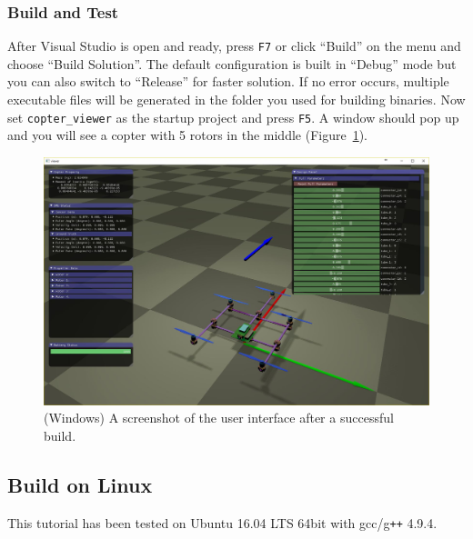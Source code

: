 \subsubsection{Build and Test}
After Visual Studio is open and ready, press \texttt{F7} or click ``Build'' on the menu and choose ``Build Solution''. The default configuration is built in ``Debug'' mode but you can also switch to ``Release'' for faster solution. If no error occurs, multiple executable files will be generated in the folder you used for building binaries. Now set \texttt{copter\_viewer} as the startup project and press \texttt{F5}. A window should pop up and you will see a copter with 5 rotors in the middle (Figure~\ref{fig:windows_default_ui}).
\begin{figure}[!htb]
	\centering
	\includegraphics[width=0.75\linewidth]{windows_default_ui}
	\caption{(Windows) A screenshot of the user interface after a successful build.}
	\label{fig:windows_default_ui}
\end{figure}

\subsection{Build on Linux}
This tutorial has been tested on Ubuntu 16.04 LTS 64bit with gcc/g\texttt{++} 4.9.4.

